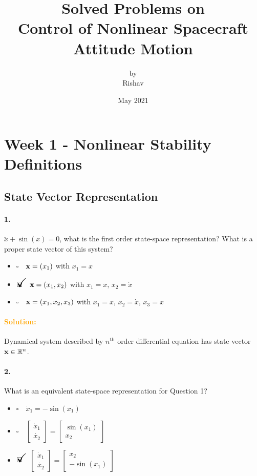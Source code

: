 \documentclass[12pt, a4paper]{article}
\title{Solved Problems on \\ Control of Nonlinear Spacecraft Attitude Motion}
\author{by \\ Rishav}
\date{May 2021}
\newcommand{\ans}{\item[]$\rlap{\LARGE{\checkmark}}\square\quad$}
\newcommand{\noans}{\item[]$\square\quad$}
\begin{document}
\maketitle
\tableofcontents

\newpage
\section{Week 1 - Nonlinear Stability Definitions}
\subsection{State Vector Representation}
\paragraph{1.}
$\ddot{x} + \sin(x) = 0$, what is the first order state-space representation? What is a proper state vector of this system?

\begin{itemize}
\noans $\text{\bf{x}} = (x_{1})$ with $x_{1} = x$
\ans  $\text{\bf{x}} = (x_{1},x_{2})$ with $x_{1} = x$, $x_{2} = \dot{x}$
\noans  $\text{\bf{x}} = (x_{1},x_{2},x_{3})$ with $x_{1} = x$, $x_{2} = \dot{x}$, $x_{3} = \ddot{x}$
\end{itemize}

\paragraph{\textcolor{orange}{Solution:}} 
Dynamical system described by $n^\text{th}$ order differential equation has state vector $\text{\bf{x}} \in \mathbb{R}^{n}$.

\paragraph{2.}
What is an equivalent state-space representation for Question 1?

\begin{itemize}
\noans $\dot{x}_{1} = -\sin(x_{1})$
\noans $\begin{bmatrix} \dot{x}_{1} \\ \dot{x_{2}}\end{bmatrix} = \begin{bmatrix} \sin(x_{1}) \\ x_{2}\end{bmatrix}$
\ans $\begin{bmatrix} \dot{x}_{1} \\ \dot{x_{2}}\end{bmatrix} = \begin{bmatrix} x_{2} \\ -\sin(x_{1}) \end{bmatrix}$
\end{itemize}
\end{document}
